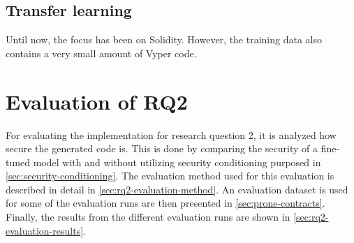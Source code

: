 %
%    


\subsection{Transfer learning}
Until now, the focus has been on Solidity. However, the training data also contains a very small amount of Vyper code. 


%
%
%

\FloatBarrier

\section{Evaluation of RQ2}
\label{sec:rq2-evaluation}
For evaluating the implementation for research question 2, it is analyzed how secure the generated code is. This is done by comparing the security of a fine-tuned model with and without utilizing security conditioning purposed in \cref{sec:security-conditioning}. The evaluation method used for this evaluation is described in detail in \cref{sec:rq2-evaluation-method}. An evaluation dataset is used for some of the evaluation runs are then presented in \cref{sec:prone-contracts}. Finally, the results from the different evaluation runs are shown in \cref{sec:rq2-evaluation-results}.

